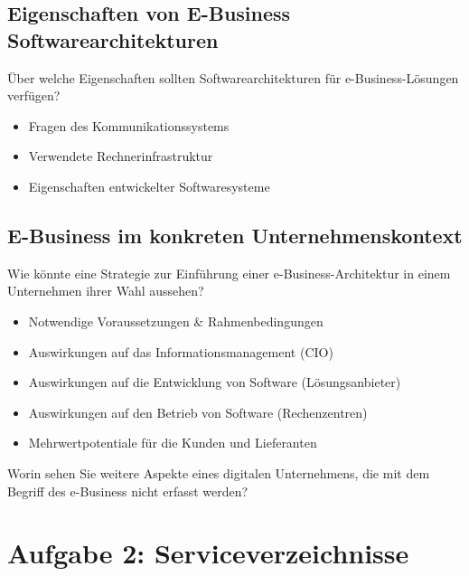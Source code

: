 \documentclass[notitlepage, hidelinks]{article}
\begin{document}
\subsection{Eigenschaften von E-Business Softwarearchitekturen}
Über welche Eigenschaften sollten Softwarearchitekturen für e-Business-Lösungen verfügen?
\begin{itemize}
\item Fragen des Kommunikationssystems
\item Verwendete Rechnerinfrastruktur
\item Eigenschaften entwickelter Softwaresysteme
\end{itemize}

\subsection{E-Business im konkreten Unternehmenskontext}
Wie könnte eine Strategie zur Einführung einer e-Business-Architektur in einem Unternehmen ihrer Wahl aussehen?
\begin{itemize}
\item Notwendige Voraussetzungen \& Rahmenbedingungen
\item Auswirkungen auf das Informationsmanagement (CIO)
\item Auswirkungen auf die Entwicklung von Software (Lösungsanbieter)
\item Auswirkungen auf den Betrieb von Software (Rechenzentren)
\item Mehrwertpotentiale für die Kunden und Lieferanten
\end{itemize}

Worin sehen Sie weitere Aspekte eines digitalen Unternehmens, die mit dem Begriff des e-Business nicht erfasst werden?

\newpage

\section{Aufgabe 2: Serviceverzeichnisse}
\end{document}
